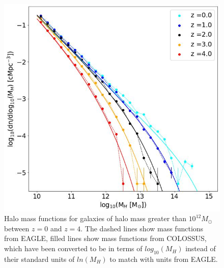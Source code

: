 \documentclass[12pt]{article}%
\begin{document}
\begin{figure}[H]
\centering
\includegraphics[width=\linewidth]{Mass_Function.jpeg}
\caption{Halo mass functions for galaxies of halo mass greater than $10^{12}M_\odot$ between $z=0$ and $z=4$. The dashed lines show mass functions from EAGLE, filled lines show mass functions from COLOSSUS, which have been converted to be in terms of $log_{10}(M_H)$ instead of their standard units of $ln(M_H)$ to match with units from EAGLE.}
\label{fig:1}
\end{figure}

\onecolumngrid
\end{document}
